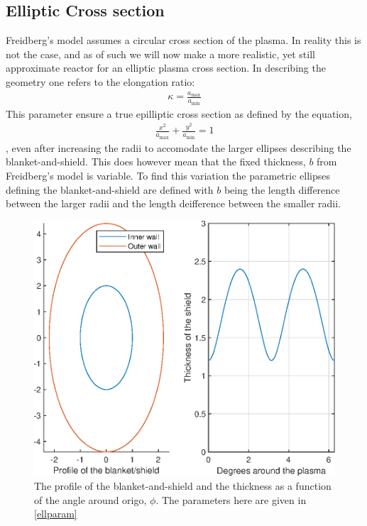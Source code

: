 \subsection{Elliptic Cross section}
Freidberg's model assumes a circular cross section of the plasma. In reality this is not the case, and as of such we will now make a more realistic, yet still approximate reactor for an elliptic plasma cross section.
In describing the geometry one refers to the elongation ratio:
\begin{align}
	\kappa = \frac{a_{\max}}{a_{\min}}
\end{align}
This parameter ensure a true epilliptic cross section as defined by the equation,
\begin{align}
	\frac{x^2}{a_{\max}}+\frac{y^2}{a_{\min}} = 1
\end{align}
, even after increasing the radii to accomodate the larger ellipses describing the blanket-and-shield. This does however mean that the fixed thickness, \(b\) from Freidberg's model is variable. To find this variation the parametric ellipses defining the blanket-and-shield are defined with \(b\) being the length difference between the larger radii and the length deifference between the smaller radii.
\begin{figure}
	\includegraphics[width=.4\textwidth]{MatlabFigures/ShieldThickness/ShieldThickness.eps}
	\caption{The profile of the blanket-and-shield and the thickness as a function of the angle around origo, \(\phi\). The parameters here are given in \cref{ellparam}}
	\label{ShTh}
\end{figure}
